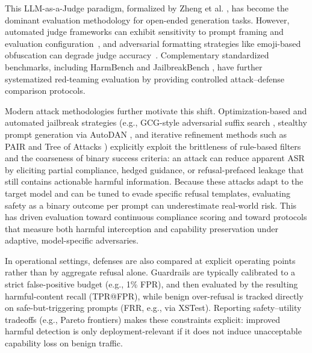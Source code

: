 \documentclass[10pt, twocolumn]{article}
\begin{document}
This LLM-as-a-Judge paradigm, formalized by Zheng et al. \cite{zheng2023judging}, has become the dominant evaluation methodology for open-ended generation tasks. However, automated judge frameworks can exhibit sensitivity to prompt framing and evaluation configuration~\cite{zheng2023judging}, and adversarial formatting strategies like emoji-based obfuscation can degrade judge accuracy~\cite{emojiattack2024}. Complementary standardized benchmarks, including HarmBench \cite{mazeika2024harmbench} and JailbreakBench \cite{jailbreakbench2024}, have further systematized red-teaming evaluation by providing controlled attack--defense comparison protocols.

Modern attack methodologies further motivate this shift. Optimization-based and automated jailbreak strategies (e.g., GCG-style adversarial suffix search \cite{zou2023universal}, stealthy prompt generation via AutoDAN \cite{liu2023autodan}, and iterative refinement methods such as PAIR \cite{chao2023jailbreaking} and Tree of Attacks \cite{mehrotra2023tree}) explicitly exploit the brittleness of rule-based filters and the coarseness of binary success criteria: an attack can reduce apparent ASR by eliciting partial compliance, hedged guidance, or refusal-prefaced leakage that still contains actionable harmful information. Because these attacks adapt to the target model and can be tuned to evade specific refusal templates, evaluating safety as a binary outcome per prompt can underestimate real-world risk. This has driven evaluation toward continuous compliance scoring and toward protocols that measure both harmful interception and capability preservation under adaptive, model-specific adversaries.

In operational settings, defenses are also compared at explicit operating points rather than by aggregate refusal alone. Guardrails are typically calibrated to a strict false-positive budget (e.g., 1\% FPR), and then evaluated by the resulting harmful-content recall (TPR@FPR), while benign over-refusal is tracked directly on safe-but-triggering prompts (FRR, e.g., via XSTest). Reporting safety--utility tradeoffs (e.g., Pareto frontiers) makes these constraints explicit: improved harmful detection is only deployment-relevant if it does not induce unacceptable capability loss on benign traffic.
\end{document}
